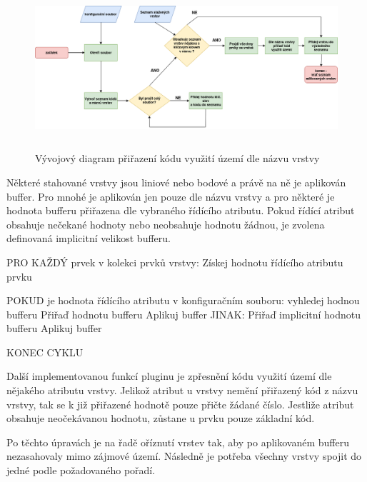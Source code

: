 \documentclass[a4paper,oneside,12pt]{book}
\begin{document}
\begin{figure}[H] \label{obr17}
\centering
\includegraphics[height=6cm]{pictures/LUcode_diagram.png}
\caption{Vývojový diagram přiřazení kódu využití území dle názvu vrstvy}
\label{fig:LU_diagram}
\end{figure}

\hspace{10mm}Některé stahované vrstvy jsou liniové nebo bodové a právě na ně je aplikován buffer. Pro mnohé je aplikován jen pouze dle názvu vrstvy a pro některé je hodnota bufferu přiřazena dle vybraného řídícího atributu. Pokud řídící atribut obsahuje nečekané hodnoty nebo neobsahuje hodnotu žádnou, je zvolena definovaná implicitní velikost bufferu.

\begin{pseudocode}[style=mypseudocode, caption={Přiřazení velikosti bufferu}, label={kod:buffer}]
PRO KAŽDÝ prvek v kolekci prvků vrstvy:
    Získej hodnotu řídícího atributu prvku
 
    POKUD je hodnota řídícího atributu v konfiguračním souboru:
        vyhledej hodnou bufferu
        Přiřaď hodnotu bufferu
        Aplikuj buffer
    JINAK:
        Přiřaď implicitní hodnotu bufferu
        Aplikuj buffer
    
KONEC CYKLU
\end{pseudocode}

\hspace{10mm}Další implementovanou funkcí pluginu je  zpřesnění kódu využití území dle nějakého atributu vrstvy. Jelikož atribut u vrstvy nemění přiřazený kód z názvu vrstvy, tak se k již přiřazené hodnotě pouze přičte žádané číslo. Jestliže atribut obsahuje neočekávanou hodnotu, zůstane u prvku pouze základní kód.

 \hspace{10mm}Po těchto úpravách je na řadě oříznutí vrstev tak, aby po aplikovaném bufferu nezasahovaly mimo zájmové území. Následně je potřeba všechny vrstvy spojit do jedné podle požadovaného pořadí. 
 
\end{document}
